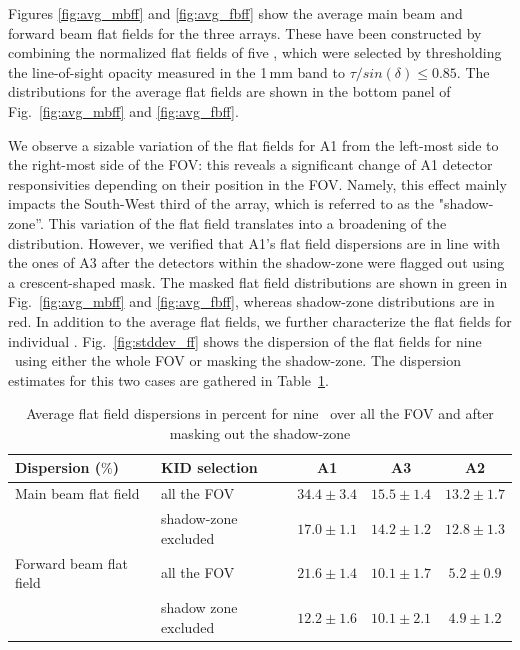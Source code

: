 Figures \ref{fig:avg_mbff} and \ref{fig:avg_fbff} show the average main beam and
forward beam flat fields for the three arrays. These have been constructed by
combining the normalized flat fields of five \bms, which were
selected by thresholding the line-of-sight opacity measured in the
1\,mm band to $\tau/sin(\delta) \leq 0.85$. The distributions for the average flat
fields are shown in the bottom panel of Fig.~\ref{fig:avg_mbff} and
\ref{fig:avg_fbff}.

We observe a sizable variation of the flat fields for A1 from the left-most side
to the right-most side of the FOV: this reveals a significant change of A1
detector responsivities depending on their position in the FOV. Namely, this
effect mainly impacts the South-West third of the array, which is
referred to as the "shadow-zone''. This variation of the
flat field translates into a broadening of the distribution. However, we verified that A1's
flat field dispersions are in line with the ones of A3 after the
detectors within the shadow-zone were flagged out using a
crescent-shaped mask. The masked flat field distributions are shown in
green in Fig.~\ref{fig:avg_mbff} and \ref{fig:avg_fbff}, whereas shadow-zone
distributions are in red. In addition to the average flat fields, we further
characterize the flat fields for individual \bms. Fig.~\ref{fig:stddev_ff}
shows the dispersion of the flat fields for nine \bms\ using
either the whole FOV or masking the shadow-zone. The dispersion estimates for
this two cases are gathered in Table~\ref{tab:flatfield_res}.

\begin{table}[!h]
\begin{center}
\begin{tabular}{|l|l|c|c|c|}
\hline
 Dispersion ($\%$)    & KID selection  &  A1 & A3  & A2 \\
\hline
Main beam flat field  & all the FOV           & $34.4 \pm 3.4$    & $15.5 \pm 1.4$  &  $13.2 \pm 1.7$  \\
                      & shadow-zone excluded  & $17.0 \pm 1.1$    & $14.2 \pm 1.2$  &  $12.8 \pm 1.3$\\
\hline
Forward beam flat field  & all the FOV           & $21.6 \pm 1.4$  & $10.1 \pm 1.7$  & $5.2 \pm 0.9$   \\
                         & shadow zone excluded  & $12.2 \pm 1.6$  & $10.1 \pm 2.1$  & $4.9 \pm 1.2$ \\
\hline
\end{tabular}
\caption[Flat field dispersions]{Average flat field dispersions in percent for
  nine \bms\ over all the FOV and after masking out the shadow-zone}
\label{tab:flatfield_res}
\end{center}
\end{table}


